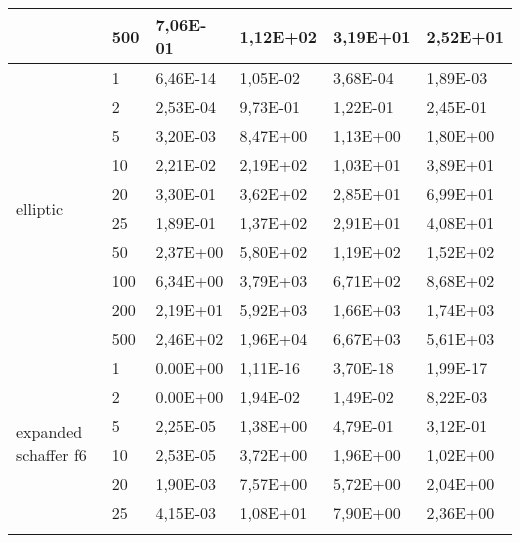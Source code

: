 \begin{longtable}[c]{|m{3.5cm}|l|l|l|l|l|}
                                        & 500       & 7,06E-01   & 1,12E+02   & 3,19E+01   & 2,52E+01  \\ \hline
\multirow{10}{*}{elliptic}              & 1         & 6,46E-14   & 1,05E-02   & 3,68E-04   & 1,89E-03  \\ \cline{2-6} 
                                        & 2         & 2,53E-04   & 9,73E-01   & 1,22E-01   & 2,45E-01  \\ \cline{2-6} 
                                        & 5         & 3,20E-03   & 8,47E+00   & 1,13E+00   & 1,80E+00  \\ \cline{2-6} 
                                        & 10        & 2,21E-02   & 2,19E+02   & 1,03E+01   & 3,89E+01  \\ \cline{2-6} 
                                        & 20        & 3,30E-01   & 3,62E+02   & 2,85E+01   & 6,99E+01  \\ \cline{2-6} 
                                        & 25        & 1,89E-01   & 1,37E+02   & 2,91E+01   & 4,08E+01  \\ \cline{2-6} 
                                        & 50        & 2,37E+00   & 5,80E+02   & 1,19E+02   & 1,52E+02  \\ \cline{2-6} 
                                        & 100       & 6,34E+00   & 3,79E+03   & 6,71E+02   & 8,68E+02  \\ \cline{2-6} 
                                        & 200       & 2,19E+01   & 5,92E+03   & 1,66E+03   & 1,74E+03  \\ \cline{2-6} 
                                        & 500       & 2,46E+02   & 1,96E+04   & 6,67E+03   & 5,61E+03  \\ \hline
\multirow{10}{*}{expanded schaffer f6}  & 1         & 0.00E+00   & 1,11E-16   & 3,70E-18   & 1,99E-17  \\ \cline{2-6} 
                                        & 2         & 0.00E+00   & 1,94E-02   & 1,49E-02   & 8,22E-03  \\ \cline{2-6} 
                                        & 5         & 2,25E-05   & 1,38E+00   & 4,79E-01   & 3,12E-01  \\ \cline{2-6} 
                                        & 10        & 2,53E-05   & 3,72E+00   & 1,96E+00   & 1,02E+00  \\ \cline{2-6} 
                                        & 20        & 1,90E-03   & 7,57E+00   & 5,72E+00   & 2,04E+00  \\ \cline{2-6} 
                                        & 25        & 4,15E-03   & 1,08E+01   & 7,90E+00   & 2,36E+00  \\ \cline{2-6} 

\end{longtable}

